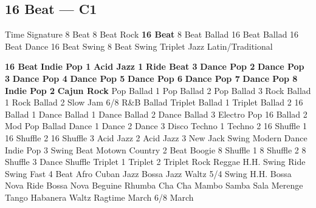\subsection{16 Beat --- C1}
Time Signature
8 Beat
8 Beat Rock
\textbf{16 Beat}
8 Beat Ballad
16 Beat Ballad
16 Beat Dance
16 Beat Swing
8 Beat Swing
Triplet
Jazz
Latin/Traditional





























\textbf{16 Beat}
\textbf{Indie Pop 1}
\textbf{Acid Jazz 1}
\textbf{Ride Beat 3}
\textbf{Dance Pop 2}
\textbf{Dance Pop 3}
\textbf{Dance Pop 4}
\textbf{Dance Pop 5}
\textbf{Dance Pop 6}
\textbf{Dance Pop 7}
\textbf{Dance Pop 8}
\textbf{Indie Pop 2}
\textbf{Cajun Rock}
Pop Ballad 1
Pop Ballad 2
Pop Ballad 3
Rock Ballad 1
Rock Ballad 2
Slow Jam
6/8 R\&B Ballad
Triplet Ballad 1
Triplet Ballad 2
16 Ballad 1
Dance Ballad 1
Dance Ballad 2
Dance Ballad 3
Electro Pop
16 Ballad 2
Mod Pop Ballad
Dance 1
Dance 2
Dance 3
Disco
Techno 1
Techno 2
16 Shuffle 1
16 Shuffle 2
16 Shuffle 3
Acid Jazz 2
Acid Jazz 3
New Jack Swing
Modern Dance
Indie Pop 3
Swing Beat
Motown
Country 2 Beat
Boogie
8 Shuffle 1
8 Shuffle 2
8 Shuffle 3
Dance Shuffle
Triplet 1
Triplet 2
Triplet Rock
Reggae
H.H. Swing
Ride Swing
Fast 4 Beat
Afro Cuban
Jazz Bossa
Jazz Waltz
5/4 Swing
H.H. Bossa Nova
Ride Bossa Nova
Beguine
Rhumba
Cha Cha
Mambo
Samba
Sala
Merenge
Tango
Habanera
Waltz
Ragtime
March
6/8 March
